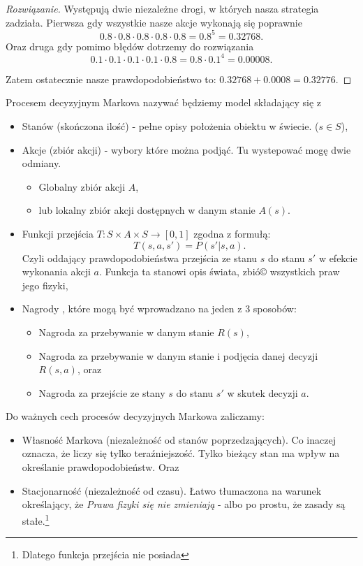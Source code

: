 \documentclass[10pt,a4paper]{book}
\begin{document}
\begin{proof}[Rozwiązanie]
Występują dwie niezależne drogi, w których nasza strategia zadziała. Pierwsza gdy wszystkie nasze akcje wykonają się poprawnie
$$
0.8 \cdot 0.8 \cdot 0.8 \cdot 0.8 \cdot 0.8 = 0.8 ^5 = 0.32768.
$$
Oraz druga gdy pomimo błędów dotrzemy do rozwiązania
$$
0.1 \cdot 0.1 \cdot 0.1 \cdot 0.1 \cdot 0.8 = 0.8 \cdot 0.1^4 = 0.00008. 
$$

Zatem ostatecznie nasze prawdopodobieństwo to: $0.32768 + 0.0008 = 0.32776$. 
\end{proof}


\begin{definition}
Procesem decyzyjnym Markova nazywać będziemy model składający się z 
\begin{itemize}
\item Stanów (skończona ilość) - pełne opisy położenia obiektu w świecie. ($s \in S$),
\item  Akcje (zbiór akcji) - wybory które można podjąć. Tu wystepować mogę dwie odmiany.
\begin{itemize}
\item Globalny zbiór akcji $A$,
\item lub lokalny zbiór akcji dostępnych w danym stanie $A(s)$.
\end{itemize}
\item Funkcji przejścia $T \colon S \times A \times S \to [0,1]$ zgodna z formułą:
$$
T(s, a, s') = P( s' | s, a ).
$$
Czyli oddający prawdopodobieństwa przejścia ze stanu $s$ do stanu $s'$ w efekcie wykonania akcji $a$. Funkcja ta stanowi opis świata, zbió© wszystkich praw jego fizyki,
\item  Nagrody , które mogą być wprowadzano na jeden z 3 sposobów:
\begin{itemize}
\item Nagroda za przebywanie w danym stanie $R(s)$,
\item Nagroda za przebywanie w danym stanie i podjęcia danej decyzji $R(s,a)$, oraz
\item Nagroda za przejście ze stany $s$ do stanu $s'$ w skutek decyzji $a$.
\end{itemize}
\end{itemize}
Do ważnych cech procesów decyzyjnych Markowa zaliczamy:
\begin{itemize}
\item Własność Markova (niezależność od stanów poprzedzających). Co inaczej oznacza, że liczy się tylko teraźniejszość. Tylko bieżący stan ma wpływ na określanie prawdopodobieństw. Oraz
\item Stacjonarność (niezależność od czasu). Łatwo tłumaczona na warunek określający, że \textit{Prawa fizyki się nie zmieniają} - albo po prostu, że zasady są stałe.\footnote{Dlatego funkcja przejścia nie posiada }
\end{itemize}
\end{definition}
\end{document}
